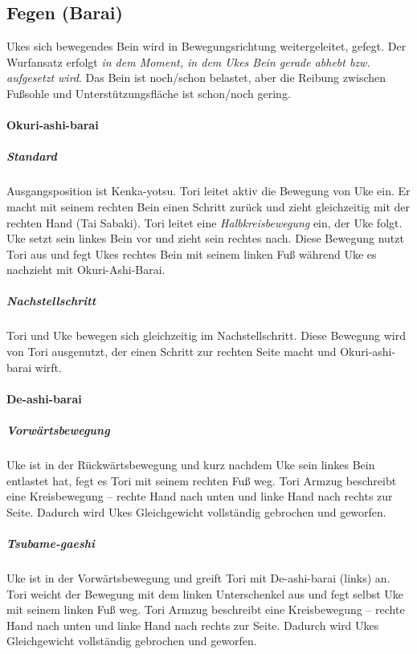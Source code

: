 \documentclass[justified, a4paper, notitlepage, captions=tableheading, nobib]{tufte-handout}
\begin{document}
\subsection{Fegen (Barai) }
\label{sec:orge7a839d}
Ukes sich bewegendes Bein wird in Bewegungsrichtung weitergeleitet, gefegt. 
Der Wurfansatz erfolgt \emph{in dem Moment, in dem Ukes Bein gerade abhebt bzw. aufgesetzt wird}. 
Das Bein ist noch/schon belastet, aber die Reibung zwischen Fußsohle und Unterstützungsfläche ist schon/noch gering.

\paragraph{Okuri-ashi-barai }
\label{sec:orge62955d}
\subparagraph{Standard}
\label{sec:orgb8859b5}
Ausgangsposition ist Kenka-yotsu. Tori leitet aktiv die Bewegung von Uke ein. Er macht mit seinem rechten Bein einen Schritt zurück und zieht gleichzeitig mit der rechten Hand (Tai Sabaki). Tori leitet eine \emph{Halbkreisbewegung} ein, der Uke folgt. Uke setzt sein linkes Bein vor und zieht sein rechtes nach. Diese Bewegung nutzt Tori aus und fegt Ukes rechtes Bein mit seinem linken Fuß während Uke es nachzieht mit Okuri-Ashi-Barai.

\subparagraph{Nachstellschritt}
\label{sec:org593ce50}
Tori und Uke bewegen sich gleichzeitig im Nachstellschritt. Diese Bewegung wird von Tori ausgenutzt, der einen Schritt zur rechten Seite macht und Okuri-ashi-barai wirft.

\paragraph{De-ashi-barai }
\label{sec:org307271f}
\subparagraph{Vorwärtsbewegung}
\label{sec:org2f3b4d1}
Uke ist in der Rückwärtsbewegung und kurz nachdem Uke sein linkes Bein entlastet hat, fegt es Tori mit seinem rechten Fuß weg. Tori Armzug beschreibt eine Kreisbewegung – rechte Hand nach unten und linke Hand nach rechts zur Seite. Dadurch wird Ukes Gleichgewicht vollständig gebrochen und geworfen.

\subparagraph{Tsubame-gaeshi}
\label{sec:org9bcc7e8}
Uke ist in der Vorwärtsbewegung und greift Tori mit De-ashi-barai (links) an. Tori weicht der Bewegung mit dem linken Unterschenkel aus und fegt selbst Uke mit seinem linken Fuß weg. Tori Armzug beschreibt eine Kreisbewegung – rechte Hand nach unten und linke Hand nach rechts zur Seite. Dadurch wird Ukes Gleichgewicht vollständig gebrochen und geworfen.
\end{document}

